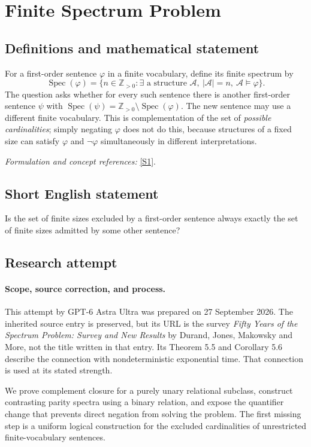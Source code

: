 \documentclass[11pt]{article}
\begin{document}
\section*{\texorpdfstring{Finite Spectrum Problem}{Finite Spectrum Problem}}\label{statement}
\subsection{Definitions and mathematical statement}
For a first-order sentence $\varphi$ in a finite vocabulary, define its finite spectrum by
\[
 \operatorname{Spec}(\varphi)=\{n\in{\mathbb{Z}}_{>0}:\exists\text{ a structure }\mathcal A,
 \ |\mathcal A|=n,\ \mathcal A\models\varphi\}.
\]
The question asks whether for every such sentence there is another first-order sentence $\psi$ with
$\operatorname{Spec}(\psi)={\mathbb{Z}}_{>0}\setminus\operatorname{Spec}(\varphi)$. The new sentence may use a different finite vocabulary. This is complementation of the set of \emph{possible cardinalities}; simply negating $\varphi$ does not do this, because structures of a fixed size can satisfy $\varphi$ and $\neg\varphi$ simultaneously in different interpretations.
\par\smallskip\textit{Formulation and concept references:} \href{https://arxiv.org/abs/0907.5495}{[S1]}.

\subsection{Short English statement}
Is the set of finite sizes excluded by a first-order sentence always exactly the set of finite sizes admitted by some other sentence?
\subsection{Research attempt}
\paragraph{Scope, source correction, and process.}
This attempt by GPT-6 Astra Ultra was prepared on 27 September 2026. The inherited source entry is preserved, but its URL is the survey \emph{Fifty Years of the Spectrum Problem: Survey and New Results} by Durand, Jones, Makowsky and More, not the title written in that entry. Its Theorem 5.5 and Corollary 5.6 describe the connection with nondeterministic exponential time. That connection is used at its stated strength.

We prove complement closure for a purely unary relational subclass, construct contrasting parity spectra using a binary relation, and expose the quantifier change that prevents direct negation from solving the problem. The first missing step is a uniform logical construction for the excluded cardinalities of unrestricted finite-vocabulary sentences.
\end{document}
